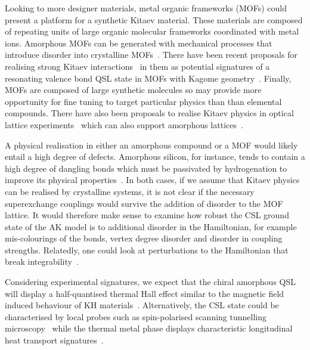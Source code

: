 Looking to more designer materials, metal organic frameworks (MOFs) could present a platform for a synthetic Kitaev material. These materials are composed of repeating units of large organic molecular frameworks coordinated with metal ions. Amorphous MOFs can be generated with mechanical processes that introduce disorder into crystalline MOFs~\autocite{bennett2014amorphous}. There have been recent proposals for realising strong Kitaev interactions~\autocite{yamadaDesigningKitaevSpin2017} in them as potential signatures of a resonating valence bond QSL state in MOFs with Kagome geometry~\autocite{misumiQuantumSpinLiquid2020}. Finally, MOFs are composed of large synthetic molecules so may provide more opportunity for fine tuning to target particular physics than than elemental compounds. There have also been proposals to realise Kitaev physics in optical lattice experiments~\autocite{duanControllingSpinExchange2003,micheliToolboxLatticespinModels2006} which can also support amorphous lattices~\autocite{sadeghiAmorphousTwodimensionalOptical2005}.

A physical realisation in either an amorphous compound or a MOF would likely entail a high degree of defects. Amorphous silicon, for instance, tends to contain a high degree of dangling bonds which must be passivated by hydrogenation to improve its physical properties~\autocite{streetHydrogenatedAmorphousSilicon1991}. In both cases, if we assume that Kitaev physics can be realised by crystalline systems, it is not clear if the necessary superexchange couplings would survive the addition of disorder to the MOF lattice. It would therefore make sense to examine how robust the CSL ground state of the AK model is to additional disorder in the Hamiltonian, for example mis-colourings of the bonds, vertex degree disorder and disorder in coupling strengths. Relatedly, one could look at perturbations to the Hamiltonian that break integrability~\autocite{Rau2014,Chaloupka2010,Chaloupka2013,Chaloupka2015,Winter2016}.

Considering experimental signatures, we expect that the chiral amorphous QSL will display a half-quantised thermal Hall effect similar to the magnetic field induced behaviour of KH materials~\autocite{Kasahara2018,Yokoi2021,Yamashita2020,Bruin2022}. Alternatively, the CSL state could be characterised by local probes such as spin-polarised scanning tunnelling microscopy~\autocite{Feldmeier2020,Konig2020,Udagawa2021} while the thermal metal phase displays characteristic longitudinal heat transport signatures~\autocite{Beenakker2013}.


